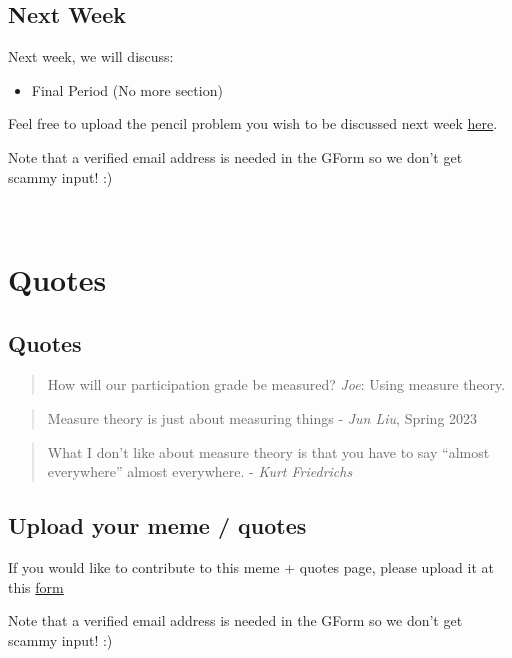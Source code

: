 \documentclass[
  letterpaper,
  DIV=11,
  numbers=noendperiod]{scrreprt}
\providecommand{\tightlist}{%
  \setlength{\itemsep}{0pt}\setlength{\parskip}{0pt}}\usepackage{longtable,booktabs,array}
\theoremstyle{definition}
\theoremstyle{plain}
\theoremstyle{remark}
\begin{document}
\hypertarget{next-week-8}{%
\section*{Next Week}\label{next-week-8}}


Next week, we will discuss:

\begin{itemize}
\tightlist
\item
  Final Period (No more section)
\end{itemize}

Feel free to upload the pencil problem you wish to be discussed next
week \href{https://forms.gle/RBmMNYJp4u3qD5W79}{here}.

Note that a verified email address is needed in the GForm so we don't
get scammy input! :)

\(\,\)


\hypertarget{quotes}{%
\chapter*{Quotes}\label{quotes}}


\hypertarget{quotes-1}{%
\section*{Quotes}\label{quotes-1}}


\begin{quote}
How will our participation grade be measured? \emph{Joe}: Using measure
theory.
\end{quote}

\begin{quote}
Measure theory is just about measuring things - \emph{Jun Liu}, Spring
2023
\end{quote}

\begin{quote}
What I don't like about measure theory is that you have to say ``almost
everywhere'' almost everywhere. - \emph{Kurt Friedrichs}
\end{quote}

\hypertarget{upload-your-meme-quotes}{%
\section*{Upload your meme / quotes}\label{upload-your-meme-quotes}}


If you would like to contribute to this meme + quotes page, please
upload it at this \href{https://forms.gle/RBmMNYJp4u3qD5W79}{form}

Note that a verified email address is needed in the GForm so we don't
get scammy input! :)

\(\,\)
\end{document}
